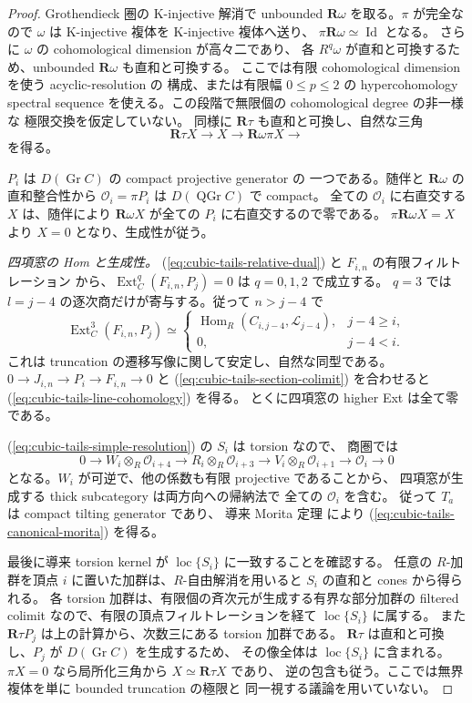 \begin{proof}
Grothendieck 圏の K-injective 解消で unbounded $\mathbf R\omega$
を取る。$\pi$ が完全なので $\omega$ は K-injective 複体を
K-injective 複体へ送り、
$\pi\mathbf R\omega\simeq\operatorname{Id}$ となる。
さらに $\omega$ の cohomological dimension が高々二であり、
各 $R^q\omega$ が直和と可換するため、unbounded
$\mathbf R\omega$ も直和と可換する。
ここでは有限 cohomological dimension を使う acyclic-resolution の
構成、または有限幅 $0\le p\le2$ の hypercohomology spectral sequence
を使える。この段階で無限個の cohomological degree の非一様な
極限交換を仮定していない。
同様に $\mathbf R\tau$ も直和と可換し、自然な三角
\[
  \mathbf R\tau X\longrightarrow X\longrightarrow
        \mathbf R\omega\pi X\longrightarrow
 \tag{CT-loc}\label{eq:cubic-tails-derived-localization}
\]
を得る。

$P_i$ は $D(\operatorname{Gr}C)$ の compact projective generator の
一つである。随伴と $\mathbf R\omega$ の直和整合性から
$\mathcal O_i=\pi P_i$ は $D(\operatorname{QGr}C)$ で compact。
全ての $\mathcal O_i$ に右直交する $X$ は、随伴により
$\mathbf R\omega X$ が全ての $P_i$ に右直交するので零である。
$\pi\mathbf R\omega X=X$ より $X=0$ となり、生成性が従う。

\emph{四項窓の Hom と生成性。}
(\ref{eq:cubic-tails-relative-dual}) と $F_{i,n}$ の有限フィルトレーション
から、$\operatorname{Ext}^q_C(F_{i,n},P_j)=0$ は $q=0,1,2$ で成立する。
$q=3$ では $l=j-4$ の逐次商だけが寄与する。従って $n>j-4$ で
\[
 \operatorname{Ext}^3_C(F_{i,n},P_j)\simeq
 \begin{cases}
  \operatorname{Hom}_R(C_{i,j-4},\mathcal L_{j-4}),&j-4\ge i,\\
  0,&j-4<i.
 \end{cases}
\]
これは truncation の遷移写像に関して安定し、自然な同型である。
$0\to J_{i,n}\to P_i\to F_{i,n}\to0$ と
(\ref{eq:cubic-tails-section-colimit}) を合わせると
(\ref{eq:cubic-tails-line-cohomology}) を得る。
とくに四項窓の higher Ext は全て零である。

(\ref{eq:cubic-tails-simple-resolution}) の $S_i$ は torsion なので、
商圏では
\[
 0\to W_i\otimes_R\mathcal O_{i+4}
 \to R_i\otimes_R\mathcal O_{i+3}
 \to V_i\otimes_R\mathcal O_{i+1}
 \to\mathcal O_i\to0
\]
となる。$W_i$ が可逆で、他の係数も有限 projective であることから、
四項窓が生成する thick subcategory は両方向への帰納法で
全ての $\mathcal O_i$ を含む。
従って $T_a$ は compact tilting generator であり、
導来 Morita 定理 \cite[\S\S4.3, 8.2]{Keller1994}
により (\ref{eq:cubic-tails-canonical-morita}) を得る。

最後に導来 torsion kernel が $\operatorname{loc}\{S_i\}$ に一致することを確認する。
任意の $R$-加群を頂点 $i$ に置いた加群は、$R$-自由解消を用いると
$S_i$ の直和と cones から得られる。
各 torsion 加群は、有限個の斉次元が生成する有界な部分加群の
filtered colimit なので、有限の頂点フィルトレーションを経て
$\operatorname{loc}\{S_i\}$ に属する。
また $\mathbf R\tau P_j$ は上の計算から、次数三にある torsion 加群である。
$\mathbf R\tau$ は直和と可換し、$P_j$ が $D(\operatorname{Gr}C)$ を生成するため、
その像全体は $\operatorname{loc}\{S_i\}$ に含まれる。
$\pi X=0$ なら局所化三角から $X\simeq\mathbf R\tau X$ であり、
逆の包含も従う。ここでは無界複体を単に bounded truncation の極限と
同一視する議論を用いていない。


\end{proof}
